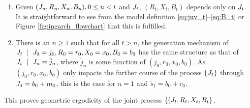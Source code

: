 \documentclass[10pt,a4paper]{article}
\begin{document}
\begin{enumerate}
\item Given $(J_u, R_u, X_u, B_u), 0 \leq u < t$ and $J_t$, $(R_t, X_t, B_t)$ depends only on $J_t$. It is straightforward to see from the model definition \eqref{eq:juv_t}--\eqref{eq:B_t} or Figure \ref{fig:ingarch_flowchart} that this is fulfilled.
\item There is an $n \geq 1$ such that for all $t > n$, the generation mechanism of $\juv_t \ \mid \ \juv_0 = j_0, R_0 = r_0, X_0 = x_0, B_0 = b_0$ has the same structure as that of $J_t \ \mid \ J_n = \tilde{j}_n$, where $\tilde{j}_n$ is some function of $(j_0, r_0, x_0, b_0)$. As $(j_0, r_0, x_0, b_0)$ only impacts the further course of the process $\{J_t\}$ through $J_1 = b_0 + m_0$, this is the case for $n = 1$ and $\tilde{s}_1 = b_0 + r_0$.
\end{enumerate}

This proves geometric ergodicity of the joint process $\{(J_t, R_t, X_t, B_t\}$.





%
%
%
%
\end{document}
